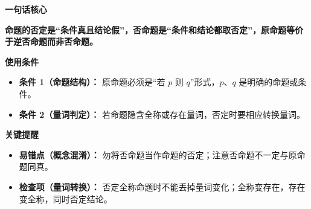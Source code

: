 \begin{summarybox}

	\textbf{\textcolor{CSummary}{一句话核心}}

	\textbf{命题的否定是“条件真且结论假”，否命题是“条件和结论都取否定”，原命题等价于逆否命题而非否命题。}

	\medskip
	\textbf{\textcolor{CSummary}{使用条件}}
	\begin{itemize}[leftmargin=*, itemsep=0.5em, topsep=0.4em]
		\item \textbf{条件 1（命题结构）：} 原命题必须是“若 $p$ 则 $q$”形式，$p$、$q$ 是明确的命题或条件。
		\item \textbf{条件 2（量词判定）：} 若命题隐含全称或存在量词，否定时要相应转换量词。
	\end{itemize}

	\medskip
	\textbf{\textcolor{CSummary}{关键提醒}}
	\begin{itemize}[leftmargin=*, itemsep=0.5em, topsep=0.4em]
		\item \textbf{易错点（概念混淆）：} 勿将否命题当作命题的否定；注意否命题不一定与原命题同真。
		\item \textbf{检查项（量词转换）：} 否定全称命题时不能丢掉量词变化；全称变存在，存在变全称，同时否定结论。
	\end{itemize}
\end{summarybox}
